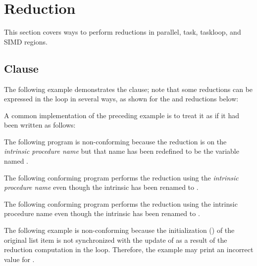 \pagebreak

\section{Reduction}
\label{sec:reduction}

This section covers ways to perform reductions in parallel, task, taskloop, and SIMD regions.

\subsection{ Clause}
\label{subsec:reduction}

The following example demonstrates the  clause; note that some 
reductions can be expressed in the loop in several ways, as shown for the  
and  reductions below:


\pagebreak


A common implementation of the preceding example is to treat it as if it had been 
written as follows:


\begin{fortranspecific}

The following program is non-conforming because the reduction is on the 
\emph{intrinsic procedure name}  but that name has been redefined to be the variable 
named .


The following conforming program performs the reduction using the 
\emph{intrinsic procedure name}  even though the intrinsic
 has been renamed to .


The following conforming program performs the reduction using 
the intrinsic procedure name  even though the intrinsic 
has been renamed to .

\pagebreak
{}
\end{fortranspecific}

The following example is non-conforming because the initialization () of the original list item  is not synchronized with the update of 
 as a result of the reduction computation in the  loop. Therefore, 
the example may print an incorrect value for .

